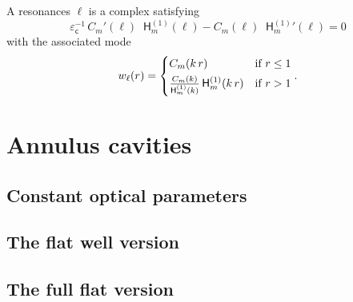 \documentclass[12pt,a4paper]{article}
\newcommand{\Hu}{\mathop{}\!\mathsf{H}^{(1)}}
\newcommand{\ecav}{\varepsilon_\mathsf{c}}
\begin{document}
A resonances $\ell$ is a complex satisfying
\begin{equation}
    \ecav^{-1}\, C_m'(\ell) \Hu_m(\ell) - C_m(\ell) {\Hu_m}'(\ell) = 0
\end{equation}
with the associated mode
\begin{equation}
    w_\ell(r) = \begin{dcases}
        C_m(k\, r) & \text{if } r \le 1\\
        \tfrac{C_m(k)}{\Hu_m(k)}\Hu_m(k\, r) & \text{if } r > 1
    \end{dcases}.
\end{equation}

\section{Annulus cavities}

\subsection{Constant optical parameters}

\subsection{The flat well version}

\subsection{The full flat version}



\end{document}
